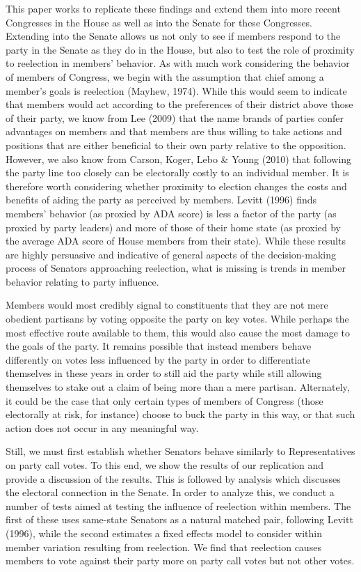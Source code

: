 \documentclass[12pt]{article}
\begin{document}
This paper works to replicate these findings and extend them into more recent Congresses in the House as well as into the Senate for these Congresses. Extending into the Senate allows us not only to see if members respond to the party in the Senate as they do in the House, but also to test the role of proximity to reelection in members' behavior. As with much work considering the behavior of members of Congress, we begin with the assumption that chief among a member's goals is reelection (Mayhew, 1974). While this would seem to indicate that members would act according to the preferences of their district above those of their party, we know from Lee (2009) that the name brands of parties confer advantages on members and that members are thus willing to take actions and positions that are either beneficial to their own party relative to the opposition. However, we also know from Carson, Koger, Lebo \& Young (2010) that following the party line too closely can be electorally costly to an individual member. It is therefore worth considering whether proximity to election changes the costs and benefits of aiding the party as perceived by members. Levitt (1996) finds members' behavior (as proxied by ADA score) is less a factor of the party (as proxied by party leaders) and more of those of their home state (as proxied by the average ADA score of House members from their state). While these results are highly persuasive and indicative of general aspects of the decision-making process of Senators approaching reelection, what is missing is trends in member behavior relating to party influence. 

Members would most credibly signal to constituents that they are not mere obedient partisans by voting opposite the party on key votes. While perhaps the most effective route available to them, this would also cause the most damage to the goals of the party. It remains possible that instead members behave differently on votes less influenced by the party in order to differentiate themselves in these years in order to still aid the party while still allowing themselves to stake out a claim of being more than a mere partisan. Alternately, it could be the case that only certain types of members of Congress (those electorally at risk, for instance) choose to buck the party in this way, or that such action does not occur in any meaningful way. 

Still, we must first establish whether Senators behave similarly to Representatives on party call votes. To this end, we show the results of our replication and provide a discussion of the results. This is followed by analysis which discusses the electoral connection in the Senate. In order to analyze this, we conduct a number of tests aimed at testing the influence of reelection within members. The first of these uses same-state Senators as a natural matched pair, following Levitt (1996), while the second estimates a fixed effects model to consider within member variation resulting from reelection. We find that reelection causes members to vote against their party more on party call votes but not other votes.
\end{document}
